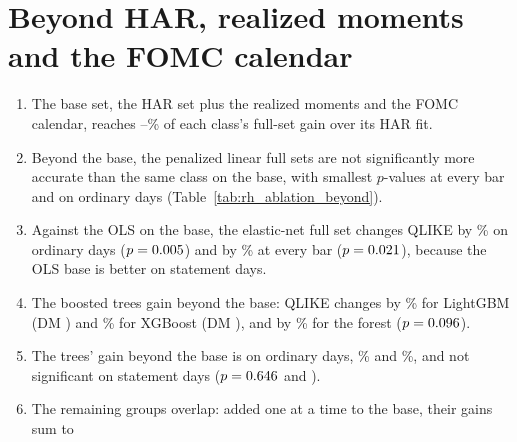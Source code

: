 



\section{Beyond HAR, realized moments and the FOMC calendar}
\label{sec:rh_beyond}

\begin{enumerate}
\item The base set, the HAR set plus the realized moments and the FOMC calendar, reaches
  \rhabBaseShareMin--\rhabBaseShareMax\% of each class's full-set gain over its HAR fit.
\item Beyond the base, the penalized linear full sets are not significantly more accurate than the same class on the
  base, with smallest $p$-values \rhabLinFullVsAddRmFomcAllPMin{} at every bar and \rhabLinFullVsAddRmFomcOrdPMin{} on
  ordinary days (Table~\ref{tab:rh_ablation_beyond}).
\item Against the OLS on the base, the elastic-net full set changes QLIKE by \rhbyFLFullOrdPct\% on ordinary days
  ($p = 0.005$) and by \rhbyFLFullAllPct\% at every bar ($p = 0.021$), because the OLS base is
  better on statement days.
\item The boosted trees gain beyond the base: QLIKE changes by \rhabLgbmFullVsAddRmFomcAllPct\% for LightGBM (DM
  \rhabLgbmFullVsAddRmFomcAllDm) and \rhabXgbFullVsAddRmFomcAllPct\% for XGBoost (DM \rhabXgbFullVsAddRmFomcAllDm), and
  by \rhabRfFullVsAddRmFomcAllPct\% for the forest ($p = 0.096$).
\item The trees' gain beyond the base is on ordinary days, \rhabLgbmFullVsAddRmFomcOrdPct\% and
  \rhabXgbFullVsAddRmFomcOrdPct\%, and not significant on statement days ($p = 0.646$ and
  \rhabXgbFullVsAddRmFomcEvP).
\item The remaining groups overlap: added one at a time to the base, their gains sum to \rhabLgbmBeyondRatioAll{}

\end{enumerate}
